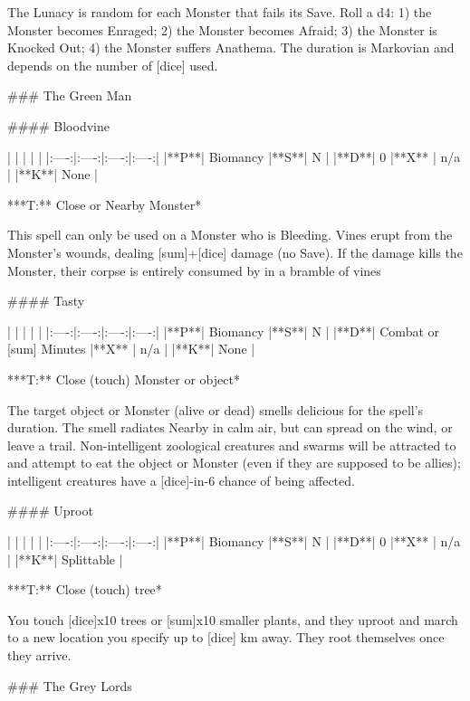 The Lunacy is random for each Monster that fails its Save.  Roll a d4:  1) the Monster becomes Enraged; 2) the Monster becomes Afraid; 3) the Monster is Knocked Out; 4) the Monster suffers Anathema.  The duration is Markovian and depends on the number of [dice] used.


### The Green Man





#### Bloodvine

| | | | |
|:----:|:----:|:----:|:----:|
|**P**| Biomancy |**S**|  N |
|**D**| 0 |**X** |  n/a  |
|**K**| None |


***T:**   Close or Nearby Monster*



This spell can only be used on a Monster who is Bleeding.  Vines erupt from the Monster's wounds, dealing [sum]+[dice] damage (no Save).  If the damage kills the Monster, their corpse is entirely consumed by in a bramble of vines




#### Tasty

| | | | |
|:----:|:----:|:----:|:----:|
|**P**| Biomancy |**S**|  N |
|**D**| Combat or [sum] Minutes |**X** |  n/a  |
|**K**| None |


***T:**   Close (touch) Monster or object*



The target object or Monster (alive or dead) smells delicious for the spell's duration.  The smell radiates Nearby in calm air, but can spread on the wind, or leave a trail.  Non-intelligent zoological creatures and swarms will be attracted to and attempt to eat the object or Monster (even if they are supposed to be allies); intelligent creatures have a [dice]-in-6 chance of being affected.  





#### Uproot

| | | | |
|:----:|:----:|:----:|:----:|
|**P**| Biomancy |**S**|  N |
|**D**| 0 |**X** |  n/a  |
|**K**| Splittable |


***T:**   Close (touch) tree*



You touch [dice]x10 trees or [sum]x10 smaller plants, and they uproot and march to a new location you specify up to [dice] km away. They root themselves once they arrive.


### The Grey Lords





